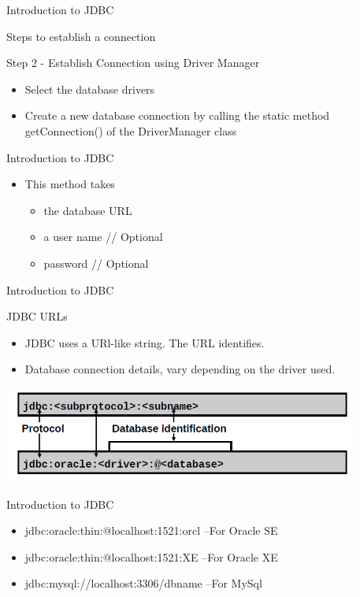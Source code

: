 \documentclass[14pt]{beamer}
\begin{document}
\begin{frame}{Introduction to JDBC}
\begin{block}{}
Steps to establish a connection 
\end{block}
\begin{block}{}
Step 2 -  Establish Connection using Driver Manager
\end{block}

\begin{itemize}
\item Select the database drivers 
\item Create a new database connection by calling the static method getConnection() of the DriverManager class
\end{itemize}
\end{frame}

\begin{frame}{Introduction to JDBC}
\begin{itemize}
\item This method takes
\begin{itemize} 
\item the database URL 
\item a user name    // Optional 
\item password       // Optional
\end{itemize}
\end{itemize}
\end{frame}


\begin{frame}{Introduction to JDBC}
\begin{block}{}
JDBC URLs
\end{block}
\begin{itemize} 
\item JDBC uses a URl-like string. The URL identifies.
\item Database connection details, vary depending on the driver used.
\end{itemize}
\begin{center}
    \includegraphics[scale=0.5]{JEE-M03-S01-Image8.png}
  \end{center}
\end{frame}
\begin{frame}{Introduction to JDBC}
\begin{itemize} 
\item jdbc:oracle:thin:@localhost:1521:orcl --For Oracle SE
\item jdbc:oracle:thin:@localhost:1521:XE --For Oracle XE
\item jdbc:mysql://localhost:3306/dbname --For MySql
\end{itemize}
\end{frame}
\end{document}
